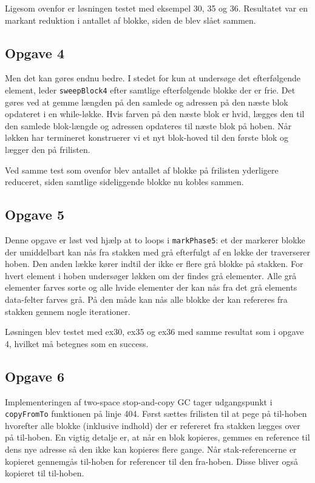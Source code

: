 \documentclass{article}
\begin{document}
Ligesom ovenfor er løsningen testet med eksempel 30, 35 og 36. Resultatet var en markant reduktion i antallet af blokke, siden de blev slået sammen.

\subsection*{Opgave 4}
Men det kan gøres endnu bedre. I stedet for kun at undersøge det efterfølgende element, leder \texttt{sweepBlock4} efter samtlige efterfølgende blokke der er frie. Det gøres ved at gemme længden på den samlede og adressen på den næste blok opdateret i en while-løkke. Hvis farven på den næste blok er hvid, lægges den til den samlede blok-længde og adressen opdateres til næste blok på hoben. Når løkken har termineret konstruerer vi et nyt blok-hoved til den første blok og lægger den på frilisten.

Ved samme test som ovenfor blev antallet af blokke på frilisten yderligere reduceret, siden samtlige sideliggende blokke nu kobles sammen.

\subsection*{Opgave 5}
Denne opgave er løst ved hjælp at to loops i \texttt{markPhase5}: et der markerer blokke der umiddelbart kan nås fra stakken med grå efterfulgt af en løkke der traverserer hoben. Den anden lække kører indtil der ikke er flere grå blokke på stakken. For hvert element i hoben undersøger løkken om der findes grå elementer. Alle grå elementer farves sorte og alle hvide elementer der kan nås fra det grå elements data-felter farves grå. På den måde kan nås alle blokke der kan refereres fra stakken gennem nogle iterationer.

Løsningen blev testet med ex30, ex35 og ex36 med samme resultat som i opgave 4, hvilket må betegnes som en success.

\subsection*{Opgave 6}
Implementeringen af two-space stop-and-copy GC tager udgangspunkt i \texttt{copyFromTo} funktionen på linje 404. Først sættes frilisten til at pege på til-hoben hvorefter alle blokke (inklusive indhold) der er refereret fra stakken lægges over på til-hoben. En vigtig detalje er, at når en blok kopieres, gemmes en reference til dens nye adresse så den ikke kan kopieres flere gange. Når stak-referencerne er kopieret gennemgås til-hoben for referencer til den fra-hoben. Disse bliver også kopieret til til-hoben.
\end{document}
